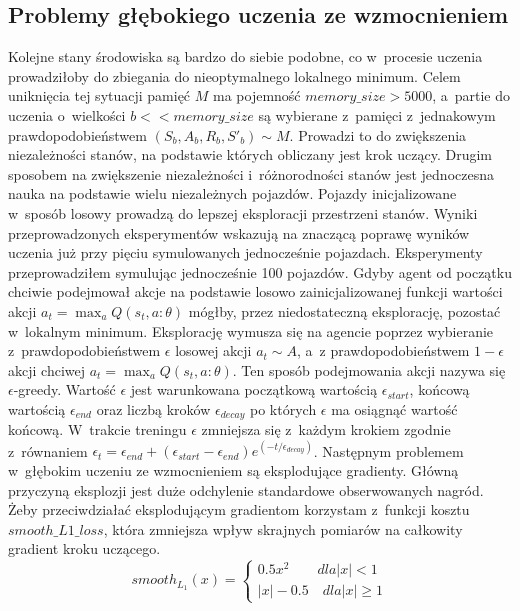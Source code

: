 \documentclass[12pt, oneside]{article}
\begin{document}
\subsection{Problemy głębokiego uczenia ze wzmocnieniem}
Kolejne stany środowiska są bardzo do siebie podobne, co w~procesie uczenia prowadziłoby do zbiegania do nieoptymalnego lokalnego minimum. Celem uniknięcia tej sytuacji pamięć $M$ ma pojemność $memory\_size > 5 000$, a~partie do uczenia o~wielkości $b<<memory\_size$ są wybierane z~pamięci z~jednakowym prawdopodobieństwem $(S_b,A_b,R_b,S'_b) \sim M$. Prowadzi to do zwiększenia niezależności stanów, na podstawie których obliczany jest krok uczący. Drugim sposobem na zwiększenie niezależności i~różnorodności stanów jest jednoczesna nauka na podstawie wielu niezależnych pojazdów. Pojazdy inicjalizowane w~sposób losowy prowadzą do lepszej eksploracji przestrzeni stanów. Wyniki przeprowadzonych eksperymentów wskazują na znaczącą poprawę wyników uczenia już przy pięciu symulowanych jednocześnie pojazdach. Eksperymenty przeprowadziłem symulując jednocześnie 100 pojazdów.
\newline\newline
Gdyby agent od początku chciwie podejmował akcje na podstawie losowo zainicjalizowanej funkcji wartości akcji  $a_t=\max_aQ(s_t,a:\theta)$ mógłby, przez niedostateczną eksplorację, pozostać w~lokalnym minimum. Eksplorację wymusza się na agencie poprzez wybieranie z~prawdopodobieństwem $\epsilon$ losowej akcji $a_t \sim A$, a~z prawdopodobieństwem $1-\epsilon$ akcji chciwej $a_t=\max_aQ(s_t,a:\theta)$. Ten sposób podejmowania akcji nazywa się $\epsilon$-greedy\cite{sutton}. Wartość $\epsilon$ jest warunkowana początkową wartością $\epsilon_{start}$, końcową wartością $\epsilon_{end}$ oraz liczbą kroków  $\epsilon_{decay}$ po których $\epsilon$ ma osiągnąć wartość końcową. W~trakcie treningu $\epsilon$ zmniejsza się z~każdym krokiem zgodnie z~równaniem $\epsilon_t=\epsilon_{end} + (\epsilon_{start} - \epsilon_{end}) e^{(-t/\epsilon_{decay})}$. 
\newline \newline
Następnym problemem w~głębokim uczeniu ze wzmocnieniem są eksplodujące gradienty. Główną przyczyną eksplozji jest duże odchylenie standardowe obserwowanych nagród. Żeby przeciwdziałać eksplodującym gradientom korzystam z~funkcji kosztu $smooth\_ L1\_ loss$\cite{frnn}, która zmniejsza wpływ skrajnych pomiarów na całkowity gradient kroku uczącego.
\begin{equation}
smooth_{L_1}(x)=
\begin{cases}
0.5x^2 \qquad dla |x|<1\\
|x|-0.5 \quad dla |x| \geq 1
\end{cases}
\end{equation}
\end{document}
